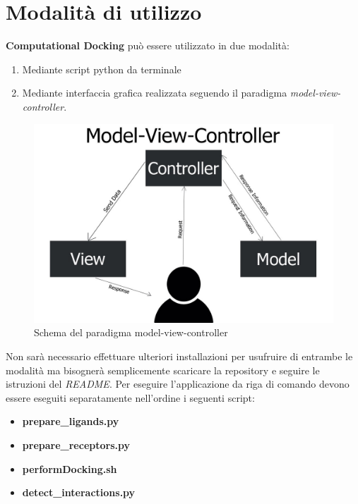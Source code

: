 \section{Modalità di utilizzo}
\textbf{Computational Docking} può essere utilizzato in due modalità:

\begin{enumerate}[label=\arabic{*}., ref=(\arabic{*})]
    \item Mediante script python da terminale
    \item Mediante interfaccia grafica realizzata seguendo il paradigma \textit{model-view-controller}.
\end{enumerate}

\begin{figure}[H]
    \centering
    \includegraphics[scale=0.4]{immagini/capitolo3/model-view-controller.jpg}
    \caption{Schema del paradigma model-view-controller}
    \label{fig:model-view-controller}
\end{figure}

Non sarà necessario effettuare ulteriori installazioni per usufruire di entrambe le modalità ma bisognerà semplicemente scaricare la repository e seguire le istruzioni del \textit{README}.\newline
Per eseguire l'applicazione da riga di comando devono essere eseguiti separatamente nell'ordine i seguenti script:

\begin{itemize}
    \item \textbf{prepare\_ligands.py}
    \item \textbf{prepare\_receptors.py}
    \item \textbf{performDocking.sh}
    \item \textbf{detect\_interactions.py}
\end{itemize}

